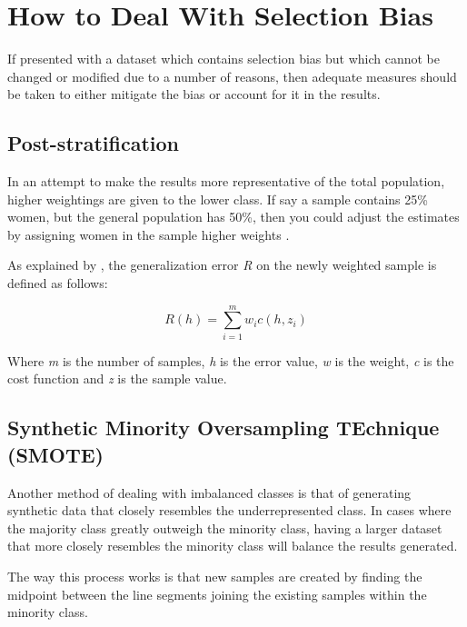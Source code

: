 	\section{How to Deal With Selection Bias}
	
	If presented with a dataset which contains selection bias but which cannot be changed or modified due to a number of reasons, then adequate measures should be taken to either mitigate the bias or account for it in the results.
	
	
	\subsection{Post-stratification}
	
	In an attempt to make the results more representative of the total population, higher weightings are given to the lower class. If say a sample contains 25\% women, but the general population has 50\%, then you could adjust the estimates by assigning women in the sample higher weights \citep{HoltSmith1979}.
	
As explained by \citet{CortesEtAl2008}, the generalization error \textit{R} on the newly weighted sample is defined as follows:
	
	\begin{equation}\label{weighted_error_function}
    R(h) = \sum_{i=1}^m w_ic(h,z_i)
	\end{equation}
	
	Where \textit{m} is the number of samples, \textit{h} is the error value, \textit{w} is the weight, \textit{c} is the cost function and \textit{z} is the sample value.
	
	\subsection{Synthetic Minority Oversampling TEchnique (SMOTE)}
	
	Another method of dealing with imbalanced classes is that of generating synthetic data that closely resembles the underrepresented class. In cases where the majority class greatly outweigh the minority class, having a larger dataset that more closely resembles the minority class will balance the results generated.
	
	The way this process works is that new samples are created by finding the midpoint between the line segments joining the existing samples within the minority class.	
	
